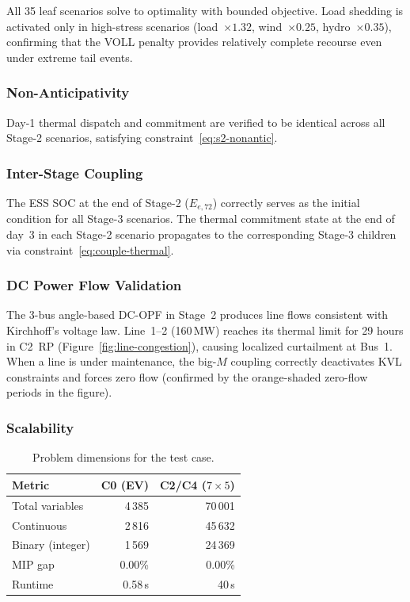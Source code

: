\documentclass[11pt]{article}
\begin{document}
All 35 leaf scenarios solve to optimality with bounded objective.
Load shedding is activated only in high-stress scenarios
(load~$\times 1.32$, wind~$\times 0.25$, hydro~$\times 0.35$),
confirming that the VOLL penalty provides relatively complete
recourse even under extreme tail events.

\subsubsection{Non-Anticipativity}

Day-1 thermal dispatch and commitment are verified to be identical
across all Stage-2 scenarios, satisfying
constraint~\eqref{eq:s2-nonantic}.

\subsubsection{Inter-Stage Coupling}

The ESS SOC at the end of Stage-2 ($E_{e,72}$) correctly serves as
the initial condition for all Stage-3 scenarios. The thermal
commitment state at the end of day~3 in each Stage-2 scenario
propagates to the corresponding Stage-3 children via
constraint~\eqref{eq:couple-thermal}.

\subsubsection{DC Power Flow Validation}

The 3-bus angle-based DC-OPF in Stage~2 produces line flows
consistent with Kirchhoff's voltage law. Line~1--2 (160\,MW)
reaches its thermal limit for 29 hours in C2~RP
(Figure~\ref{fig:line-congestion}), causing localized curtailment
at Bus~1. When a line is under maintenance, the big-$M$ coupling
correctly deactivates KVL constraints and forces zero flow
(confirmed by the orange-shaded zero-flow periods in the figure).

\subsubsection{Scalability}

\begin{table}[H]
\centering
\caption{Problem dimensions for the test case.}
\label{tab:dimensions}
\small
\begin{tabular}{lrr}
\toprule
\textbf{Metric} & \textbf{C0 (EV)} & \textbf{C2/C4 ($7{\times}5$)} \\
\midrule
Total variables        & 4\,385  & 70\,001 \\
\quad Continuous       & 2\,816  & 45\,632 \\
\quad Binary (integer) & 1\,569  & 24\,369 \\
MIP gap                & 0.00\%  & 0.00\% \\
Runtime                & 0.58\,s & 40\,s \\
\bottomrule
\end{tabular}
\end{table}
\end{document}
